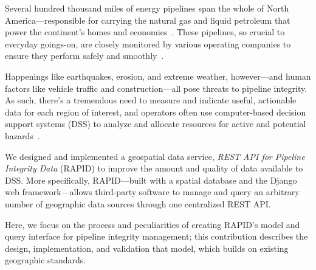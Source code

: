 Several hundred thousand miles of energy pipelines span the whole of North America---responsible for carrying the natural gas and liquid petroleum that power the continent's homes and economies~\cite{PHMSA}. These pipelines, so crucial to everyday goings-on, are closely monitored by various operating companies to ensure they perform safely and smoothly~\cite{PHMSA2013}. 

Happenings like earthquakes, erosion, and extreme weather, however---and human factors like vehicle traffic and construction---all pose threats to pipeline integrity. As such, there's a tremendous need to measure and indicate useful, actionable data for each region of interest, and operators often use computer-based decision support systems (DSS) to analyze and allocate resources for active and potential hazards~\cite{PHMSA2013,MichaelBakerJr.2008,Chastain,Dunning2013}.

We designed and implemented a geospatial data service, \textit{REST API for Pipeline Integrity Data} (RAPID) to improve the amount and quality of data available to DSS. More specifically, RAPID---built with a spatial database and the Django web framework---allows third-party software to manage and query an arbitrary number of geographic data sources through one centralized REST API.

Here, we focus on the process and peculiarities of creating RAPID's model and query interface for pipeline integrity management; this contribution describes the design, implementation, and validation that model, which builds on existing geographic standards.
